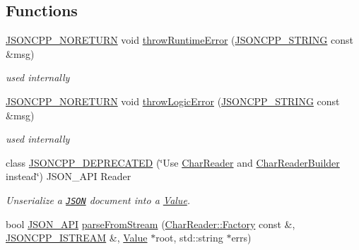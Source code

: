 \subsection*{Functions}
\begin{DoxyCompactItemize}
\item 
\hyperlink{json_8h_a78c5ba441d8b48f24a5095b97f01f282_a78c5ba441d8b48f24a5095b97f01f282}{J\+S\+O\+N\+C\+P\+P\+\_\+\+N\+O\+R\+E\+T\+U\+RN} void \hyperlink{namespaceJson_a0ab7ff7f99788262d92d9ff3d924e065_a0ab7ff7f99788262d92d9ff3d924e065}{throw\+Runtime\+Error} (\hyperlink{json_8h_a1e723f95759de062585bc4a8fd3fa4be_a1e723f95759de062585bc4a8fd3fa4be}{J\+S\+O\+N\+C\+P\+P\+\_\+\+S\+T\+R\+I\+NG} const \&msg)
\begin{DoxyCompactList}\small\item\em used internally \end{DoxyCompactList}\item 
\hyperlink{json_8h_a78c5ba441d8b48f24a5095b97f01f282_a78c5ba441d8b48f24a5095b97f01f282}{J\+S\+O\+N\+C\+P\+P\+\_\+\+N\+O\+R\+E\+T\+U\+RN} void \hyperlink{namespaceJson_a27790f21f17922fac81e7cd72a5659a5_a27790f21f17922fac81e7cd72a5659a5}{throw\+Logic\+Error} (\hyperlink{json_8h_a1e723f95759de062585bc4a8fd3fa4be_a1e723f95759de062585bc4a8fd3fa4be}{J\+S\+O\+N\+C\+P\+P\+\_\+\+S\+T\+R\+I\+NG} const \&msg)
\begin{DoxyCompactList}\small\item\em used internally \end{DoxyCompactList}\item 
class \hyperlink{namespaceJson_a61b556ffe4c70c4492a9dbe4718ec50b_a61b556ffe4c70c4492a9dbe4718ec50b}{J\+S\+O\+N\+C\+P\+P\+\_\+\+D\+E\+P\+R\+E\+C\+A\+T\+ED} (\char`\"{}Use \hyperlink{classJson_1_1CharReader}{Char\+Reader} and \hyperlink{classJson_1_1CharReaderBuilder}{Char\+Reader\+Builder} instead\char`\"{}) J\+S\+O\+N\+\_\+\+A\+PI Reader
\begin{DoxyCompactList}\small\item\em Unserialize a \href{http://www.json.org}{\tt J\+S\+ON} document into a \hyperlink{classJson_1_1Value}{Value}. \end{DoxyCompactList}\item 
bool \hyperlink{json_8h_a1d61ffde86ce1a18fd83194ff0d9a206_a1d61ffde86ce1a18fd83194ff0d9a206}{J\+S\+O\+N\+\_\+\+A\+PI} \hyperlink{namespaceJson_aab0cf1ecf81d1aeca12be2a416a84352_aab0cf1ecf81d1aeca12be2a416a84352}{parse\+From\+Stream} (\hyperlink{classJson_1_1CharReader_1_1Factory}{Char\+Reader\+::\+Factory} const \&, \hyperlink{json_8h_a15f2f70b2ce0a2abd0f8112393dbc4de_a15f2f70b2ce0a2abd0f8112393dbc4de}{J\+S\+O\+N\+C\+P\+P\+\_\+\+I\+S\+T\+R\+E\+AM} \&, \hyperlink{classJson_1_1Value}{Value} $\ast$root, std\+::string $\ast$errs)

\end{DoxyCompactItemize}
